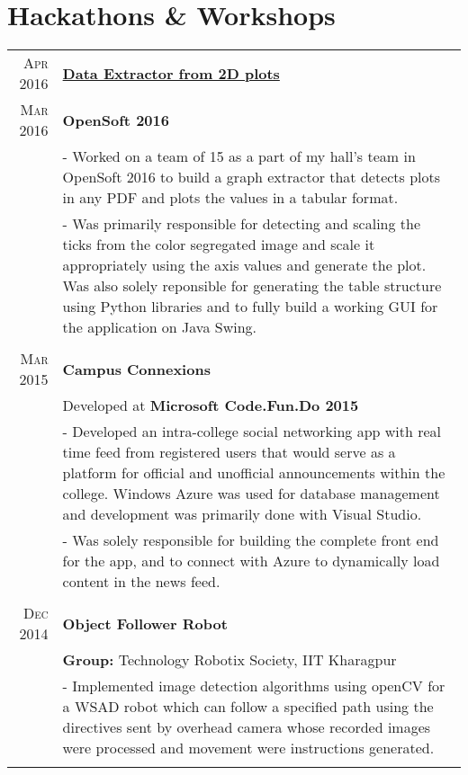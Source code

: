 \documentclass[a4paper,10pt]{extarticle} %
\begin{document}
\section{Hackathons \& Workshops}

\begin{tabular}{r|p{16cm}}

\textsc{Apr 2016} & \textbf{\href{https://github.com/ghostwriternr/Opensoft-2016}{Data Extractor from 2D plots}} \\
\textsc{Mar 2016} & \textbf{OpenSoft 2016}\\
& \footnotesize{- Worked on a team of 15 as a part of my hall's team in OpenSoft 2016 to build a graph extractor that detects plots in any PDF and plots the values in a tabular format.}\\
& \footnotesize{- Was primarily responsible for detecting and scaling the ticks from the color segregated image and scale it appropriately using the axis values and generate the plot. Was also solely reponsible for generating the table structure using Python libraries and to fully build a working GUI for the application on Java Swing.}\\
\multicolumn{2}{c}{} \\

\textsc{Mar 2015} & \textbf{Campus Connexions}\\
& Developed at \textbf{Microsoft Code.Fun.Do 2015}\\
& \footnotesize{- Developed an intra-college social networking app with real time feed from registered users that would serve as a platform for official and unofficial announcements within the college. Windows Azure was used for database management and development was primarily done with Visual Studio.}\\
& \footnotesize{- Was solely responsible for building the complete front end for the app, and to connect with Azure to dynamically load content in the news feed.}\\
\multicolumn{2}{c}{} \\

\textsc{Dec 2014} & \textbf{Object Follower Robot} \\
& \textbf{Group: }\textmd{Technology Robotix Society}, IIT Kharagpur\\
& \footnotesize{- Implemented image detection algorithms using openCV for a WSAD robot which can follow a specified path using the directives sent by overhead camera whose recorded images were processed and movement were instructions generated.}\\
\multicolumn{2}{c}{} \\

\end{tabular}
\end{document}
